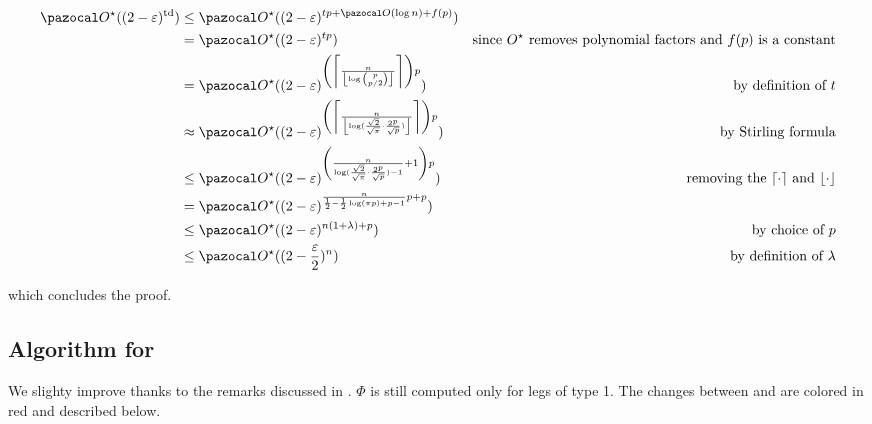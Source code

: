 \begin{align*}
    \O^\star((2-\varepsilon)^\td) &\leq \O^\star((2-\varepsilon)^{tp + \O(\log n) + f(p)})\\
    &= \O^\star((2-\varepsilon)^{tp}) & \text{since $O^\star$ removes polynomial factors and $f(p)$ is a constant}\\
    &= \O^\star((2-\varepsilon)^{\left(\left\lceil\frac{n}{\left\lfloor\log\binom{p}{p/2}\right\rfloor}\right\rceil\right) p}) & \text{by definition of $t$}\\
    &\approx \O^\star((2-\varepsilon)^{\left(\left\lceil\frac{n}{\left\lfloor\log(\frac{\sqrt{2}}{\sqrt{\pi}}\cdot\frac{2^p}{\sqrt{p}})\right\rfloor}\right\rceil\right) p}) & \text{by Stirling formula}\\
    &\leq \O^\star((2-\varepsilon)^{\left(\frac{n}{\log(\frac{\sqrt{2}}{\sqrt{\pi}}\cdot\frac{2^p}{\sqrt{p}}) - 1} + 1\right)p}) & \text{removing the $\lceil\cdot\rceil$ and $\lfloor\cdot\rfloor$}\\
    &= \O^\star((2-\varepsilon)^{\frac{n}{\frac{1}{2} - \frac{1}{2}\log(\pi p) + p - 1} p + p})\\
    &\leq \O^\star((2-\varepsilon)^{n(1+\lambda) + p}) & \text{by choice of $p$}\\
    &\leq \O^\star((2-\frac{\varepsilon}{2})^{n}) & \text{by definition of $\lambda$}
\end{align*}

which concludes the proof.

\subsection*{Algorithm for }

We slighty improve  thanks to the remarks discussed in . $\Phi$ is still computed only for legs of type 1. The changes between  and  are colored in red and described below.

